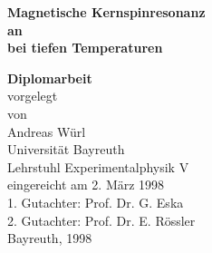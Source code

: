 %
%
%



%




\thispagestyle{empty}

%


\begin{center}
 \vspace{1cm}
\large
{\Huge\bfseries Magnetische Kernspinresonanz\\[1cm]
 an \aug\\[1cm]
 bei tiefen Temperaturen\\[3cm]}

{\Large\bf  Diplomarbeit}\vspace{2cm}\\

vorgelegt\\
von\\
Andreas Würl\vspace{1cm}\\
Universität Bayreuth\\
Lehrstuhl Experimentalphysik V\vspace{1cm}\\
eingereicht am 2. März 1998 \vspace{1cm}\\
1. Gutachter: Prof. Dr. G. Eska \\
2. Gutachter: Prof. Dr. E. Rössler \vspace{1cm}\\
\vfill
Bayreuth, 1998
\end{center}
%

\newpage
\phantom{space}
\thispagestyle{empty}
